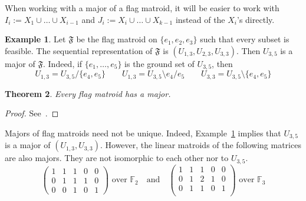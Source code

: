 \documentclass[12pt]{article}
\newtheorem{thm}{Theorem}[section]
\newtheorem{prop}[thm]{Proposition}
\theoremstyle{definition}
\newtheorem{ex}[thm]{Example}
\begin{document}
When working with a major of a flag matroid, it will be easier to work with
$I_i:=X_1 \cup \dots \cup X_{i-1}$ and $J_i:=X_i \cup \dots \cup X_{k-1}$ instead of the $X_i$'s directly.

\begin{ex}\label{ex: major example}
    Let $\mathfrak{F}$ be the flag matroid on $\{e_1,e_2,e_3\}$ such that every subset is feasible.
    The sequential representation of $\mathfrak{F}$ is $(U_{1,3}, U_{2,3}, U_{3,3})$.
    Then $U_{3,5}$ is a major of $\mathfrak{F}$.
    Indeed, if $\{e_1,\dots,e_5\}$ is the ground set of $U_{3,5}$, then
    \[
        U_{1,3} = U_{3,5} /\{e_4,e_5\} \qquad U_{1,3} = U_{3,5} \setminus e_4 / e_5 \qquad U_{3,3} = U_{3,5} \setminus \{e_4,e_5\}
    \]
\end{ex}

\begin{thm}\label{thm: majors exist}
    Every flag matroid has a major.
\end{thm}
\begin{proof}
    See~\cite[Section 8.2]{kung1986strong}.
\end{proof}

Majors of flag matroids need not be unique.
Indeed, Example~\ref{ex: major example} implies that $U_{3,5}$ is a major of $(U_{1,3}, U_{3,3})$.
However, the linear matroids of the following matrices are also majors.
They are not isomorphic to each other nor to $U_{3,5}$.
\begin{equation*}
    \begin{pmatrix}
        1 & 1 & 1 & 0 & 0 \\
        0 & 1 & 1 & 1 & 0 \\
        0 & 0 & 1 & 0 & 1
    \end{pmatrix} \text{ over $\mathbb{F}_2$} \quad \text{and} \quad 
    \begin{pmatrix}
        1 & 1 & 1 & 0 & 0 \\
        0 & 1 & 2 & 1 & 0 \\
        0 & 1 & 1 & 0 & 1 \\
    \end{pmatrix} \text{ over $\mathbb{F}_3$}
\end{equation*}



\end{document}
